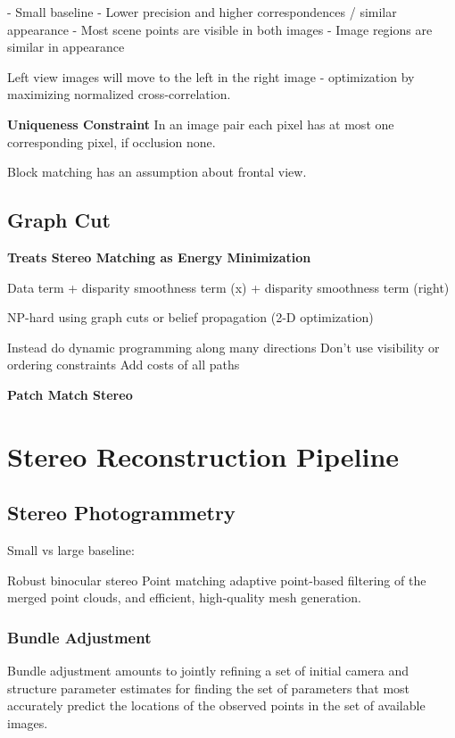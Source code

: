 \begin{enumerate}
- Small baseline
  - Lower precision and higher correspondences  / similar appearance
- Most scene points are visible in both images
- Image regions are similar in appearance

Left view images will move to the left in the right image - optimization by maximizing normalized cross-correlation.

\textbf{Uniqueness Constraint} 
In an image pair each pixel has at most one corresponding pixel, if occlusion none.

Block matching has an assumption about frontal view.

\subsection{Graph Cut}

\textbf{Treats Stereo Matching as Energy Minimization}

Data term + disparity smoothness term (x) + disparity smoothness term (right)

NP-hard using graph cuts or belief propagation (2-D optimization)

Instead do dynamic programming along many directions
Don’t use visibility or ordering constraints
Add costs of all paths

\textbf{Patch Match Stereo}


\section{Stereo Reconstruction Pipeline}

\subsection{Stereo Photogrammetry}

Small vs large baseline:

Robust binocular stereo
Point matching
adaptive point-based filtering of the merged point clouds, and efficient, high-quality mesh generation.

\subsubsection{Bundle Adjustment}

Bundle adjustment amounts to jointly refining a set of initial camera and structure parameter estimates for finding the set of parameters that most accurately predict the locations of the observed points in the set of available images. 


\end{enumerate}
